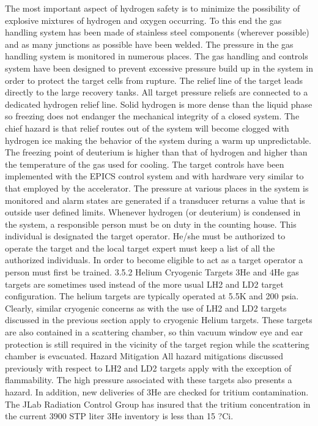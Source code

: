 {	The most important aspect of hydrogen safety is to minimize the possibility of explosive mixtures of hydrogen and oxygen occurring. To this end the gas handling system has been made of stainless steel components (wherever possible) and as many junctions as possible have been welded. The pressure in the gas handling system is monitored in numerous places. The gas handling and controls system have been designed to prevent excessive pressure build up in the system in order to protect the target cells from rupture. The relief line of the target leads directly to the large recovery tanks. All target pressure reliefs are connected to a dedicated hydrogen relief line. 
	Solid hydrogen is more dense than the liquid phase so freezing does not endanger the mechanical integrity of a closed system. The chief hazard is that relief routes out of the system will become clogged with hydrogen ice making the behavior of the system during a warm up unpredictable. The freezing point of deuterium is higher than that of hydrogen and higher than the temperature of the gas used for cooling. 
	The target controls have been implemented with the EPICS control system and with hardware very similar to that employed by the accelerator. The pressure at various places in the system is monitored and alarm states are generated if a transducer returns a value that is outside user defined limits. 
	Whenever hydrogen (or deuterium) is condensed in the system, a responsible person must be on duty in the counting house. This individual is designated the target operator. He/she must be authorized to operate the target and the local target expert must keep a list of all the authorized individuals. In order to become eligible to act as a target operator a person must first be trained. 
3.5.2	Helium Cryogenic Targets
	3He and 4He gas targets are sometimes used instead of the more usual LH2 and LD2 target configuration. The helium targets are typically operated at 5.5K and 200 psia. Clearly, similar cryogenic concerns as with the use of LH2 and LD2 targets discussed in the previous section apply to cryogenic Helium targets. These targets are also contained in a scattering chamber, so thin vacuum window eye and ear protection is still required in the vicinity of the target region while the scattering chamber is evacuated. 
Hazard Mitigation
	All hazard mitigations discussed previously with respect to LH2 and LD2 targets apply with the exception of flammability. The high pressure associated with these targets also presents a hazard. In addition, new deliveries of 3He are checked for tritium contamination. The JLab Radiation Control Group has insured that the tritium concentration in the current 3900 STP liter 3He inventory is less than 15 ?Ci.
}
